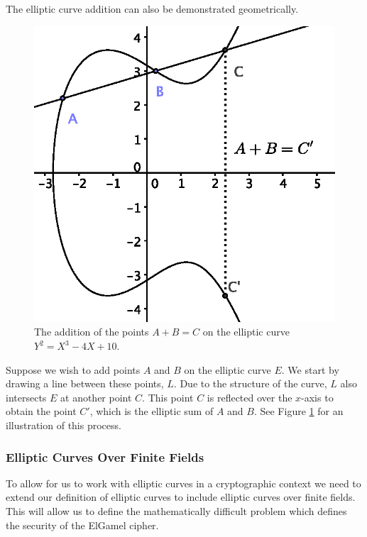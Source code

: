 \documentclass[12pt, a4paper, final]{report}
\begin{document}
The elliptic curve addition can also be demonstrated geometrically.

\begin{figure}[h]
\centering
\includegraphics[scale=0.8]{images/add-desc.eps}
\caption{The addition of the points $A + B = C$ on the elliptic
curve $Y^2 = X^3 - 4X + 10$.}
\label{fig:add}
\end{figure}

Suppose we wish to add points $A$ and $B$ on the elliptic curve $E$. We start
by drawing a line between these points, $L$. Due to the structure of the
curve, $L$ also intersects $E$ at another point $C$. This point $C$ is reflected
over the $x$-axis to obtain the point $C'$, which is the elliptic sum of
$A$ and $B$. See Figure \ref{fig:add} for an illustration of this process.

\subsubsection{Elliptic Curves Over Finite Fields}

To allow for us to work with elliptic curves in a cryptographic
context we need to extend our definition of elliptic curves to
include elliptic curves over finite fields. This will allow
us to define the mathematically difficult problem which defines
the security of the ElGamel cipher.
\end{document}

